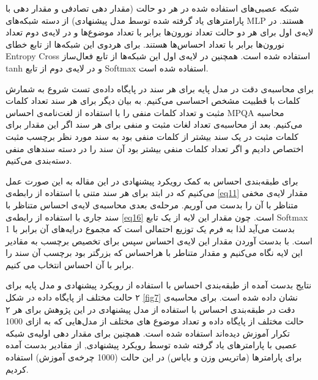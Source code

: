 \documentclass[12pt,a4paper]{article}
\begin{document}
شبکه عصبی‌های استفاده شده در هر دو حالت (مقدار دهی تصادفی و مقدار دهی با پارامترهای یاد گرفته شده توسط مدل پیشنهادی) از دسته شبکه‌های MLP هستند. در لایه‌ی اول برای هر دو حالت تعداد نورون‌ها برابر با تعداد موضوع‌ها و در لایه‌ی دوم تعداد نورون‌ها برابر با تعداد احساس‌ها هستند. برای هردوی این شبکه‌ها از تابع خطای Entropy Cross استفاده شده است. همچنین در لایه‌ی اول این شبکه‌ها از تابع فعال‌ساز tanh و در لایه‌ی دوم از تابع Softmax استفاده شده است.

برای محاسبه‌ی دقت در مدل پایه برای هر سند در پایگاه داده‌ی تست شروع به شمارش کلمات با قطبیت مشخص احساسی‌ می‌‌کنیم. به بیان دیگر برای هر سند تعداد کلمات مثبت و تعداد کلمات منفی را با استفاده از لغت‌نامه‌ی احساس MPQA محاسبه می‌کنیم. بعد از محاسبه‌ی تعداد لغات مثبت و منفی‌ برای هر سند اگر این مقدار برای کلمات مثبت در یک سند بیشتر از کلمات منفی‌ بود به سند مورد نظر برچسب مثبت اختصاص دادیم و اگر تعداد کلمات منفی‌ بیشتر بود آن سند را در دسته سندهای منفی‌ دسته‌بندی می‌کنیم.

برای طبقه‌بندی احساس به کمک رویکرد پیشنهادی در این مقاله به این صورت عمل می‌کنیم که در ابتد برای هر سند متنی با استفاده از رابطه‌ی
\ref{eq11}
 مقدار لایه‌ی مخفی متناظر با آن را بدست می آوریم. مرحله‌ی بعدی محاسبه‌ی لایه‌ی احساس متناظر با سند جاری با استفاده از رابطه‌ی
\ref{eq16}
است. چون مقدار این لایه از یک تابع Softmax بدست می‌آید لذا به فرم یک توزیع احتمالی است که مجموع درایه‌های آن برابر با 1 است. با بدست آوردن مقدار این لایه‌ی احساس سپس برای تخصیص برچسب به مقادیر این لایه نگاه می‌کنیم و مقدار متناطر با هراحساس که بزرگتر بود برچسب آن سند را برابر با آن احساس انتخاب می کنیم.

نتایج بدست آمده از طبقه‌بندی احساس با استفاده از رویکرد پیشنهادی و مدل پایه برای ۲ حالت مختلف از پایگاه داده‌ در شکل
\ref{fig7}
نشان داده شده است. برای محاسبه‌ی دقت در طبقه‌بندی احساس با استفاده از مدل پیشنهادی در این پژوهش برای هر ۲ حالت مختلف از پایگاه داده و تعداد موضوع های مختلف از مدل‌هایی که به ازای 1000 تکرار آموزش دیده‌اند استفاده شده است. همچنین برای مقدار دهی اولیه‌ی شبکه عصبی با پارامترهای یاد گرفته شده توسط رویکرد پیشنهادی, از مقادیر بدست آمده برای پارامترها (ماتریس وزن و بایاس) در این حالت (1000 چرخه‌ی آموزش) استفاده کردیم.
\end{document}
